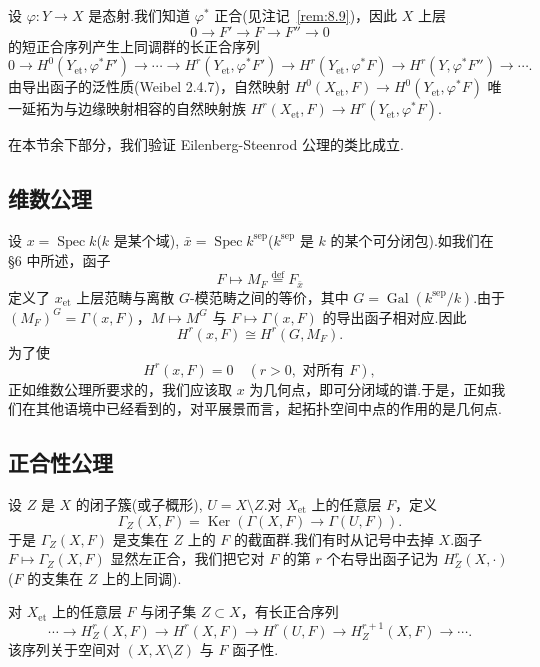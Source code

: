 \begin{remark}\label{rem:9.3}
设 $\varphi \colon Y \to X$ 是态射.我们知道 $\varphi^{*}$ 正合(见注记~\ref{rem:8.9})，因此 $X$ 上层
\[
0 \to F' \to F \to F'' \to 0
\]
的短正合序列产生上同调群的长正合序列
\[
0 \to H^{0}(Y_{\mathrm{et}}, \varphi^{*}F') \to \cdots \to H^{r}(Y_{\mathrm{et}}, \varphi^{*}F') \to H^{r}(Y_{\mathrm{et}}, \varphi^{*}F) \to H^{r}(Y, \varphi^{*}F'') \to \cdots.
\]
由导出函子的泛性质(Weibel 2.4.7)，自然映射 $H^{0}(X_{\mathrm{et}}, F) \to H^{0}(Y_{\mathrm{et}}, \varphi^{*}F)$ 唯一延拓为与边缘映射相容的自然映射族 $H^{r}(X_{\mathrm{et}}, F) \to H^{r}(Y_{\mathrm{et}}, \varphi^{*}F)$.
\end{remark}

在本节余下部分，我们验证 Eilenberg-Steenrod 公理的类比成立.

\subsection*{维数公理}

设 $x = \operatorname{Spec} k$($k$ 是某个域), $\bar{x} = \operatorname{Spec} k^{\mathrm{sep}}$($k^{\mathrm{sep}}$ 是 $k$ 的某个可分闭包).如我们在 \S 6 中所述，函子
\[
F \mapsto M_F \overset{\mathrm{def}}{=} F_{\bar{x}}
\]
定义了 $x_{\mathrm{et}}$ 上层范畴与离散 $G$-模范畴之间的等价，其中 $G = \operatorname{Gal}(k^{\mathrm{sep}}/k)$.由于 $(M_F)^{G} = \Gamma(x, F)$，$M \mapsto M^{G}$ 与 $F \mapsto \Gamma(x, F)$ 的导出函子相对应.因此
\[
H^{r}(x, F) \cong H^{r}(G, M_F).
\]
为了使
\[
H^{r}(x, F) = 0 \quad (r > 0, \text{ 对所有 } F),
\]
正如维数公理所要求的，我们应该取 $x$ 为几何点，即可分闭域的谱.于是，正如我们在其他语境中已经看到的，对平展景而言，起拓扑空间中点的作用的是几何点.

\subsection*{正合性公理}

设 $Z$ 是 $X$ 的闭子簇(或子概形), $U = X \setminus Z$.对 $X_{\mathrm{et}}$ 上的任意层 $F$，定义
\[
\Gamma_Z(X, F) = \operatorname{Ker}(\Gamma(X, F) \to \Gamma(U, F)).
\]
于是 $\Gamma_Z(X, F)$ 是支集在 $Z$ 上的 $F$ 的截面群.我们有时从记号中去掉 $X$.函子 $F \mapsto \Gamma_Z(X, F)$ 显然左正合，我们把它对 $F$ 的第 $r$ 个右导出函子记为 $H^{r}_{Z}(X, \cdot)$($F$ 的支集在 $Z$ 上的上同调).

\begin{theorem}\label{thm:9.4}
对 $X_{\mathrm{et}}$ 上的任意层 $F$ 与闭子集 $Z \subset X$，有长正合序列
\[
\cdots \to H^{r}_{Z}(X, F) \to H^{r}(X, F) \to H^{r}(U, F) \to H^{r+1}_{Z}(X, F) \to \cdots.
\]
该序列关于空间对 $(X, X \setminus Z)$ 与 $F$ 函子性.
\end{theorem}

